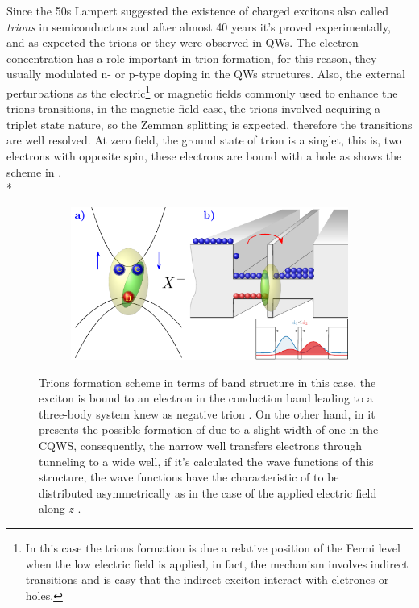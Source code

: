 Since the 50s Lampert\cite{lampert1958mobile} suggested the existence of charged excitons also called \emph{trions} in semiconductors and after almost 40 years it's proved experimentally\cite{kheng1993observation,stebe1989ground}, and as expected the trions \xp or \xm they were observed in QWs. The electron concentration has a role important in trion formation, for this reason, they usually modulated n- or p-type doping in the QWs structures.  
Also, the external perturbations as the electric\footnote{In this case the trions formation is due a relative position of the Fermi level when the low electric field is applied, in fact, the mechanism involves indirect transitions and is easy that the indirect exciton interact with elctrones or holes\cite{yuan2018tunneling}.} or magnetic fields commonly used to enhance the trions transitions, in the magnetic field case, the trions involved acquiring a triplet state nature, so the Zemman splitting is expected, therefore the transitions are well resolved. At zero field, the ground state of trion is a singlet\cite{aceituno2011therole}, this is, two electrons with opposite spin, these electrons are bound with a hole as shows the scheme in . \\*
\begin{figure}[ht!]
	\centering
	\begin{subfigure}{\textwidth}
		\includegraphics[width=\textwidth]{../figures/chapter-3/trions-scheme/build/trions-sheme}
		\label{subfig:chapter-4-trions-scheme-a)}
		\label{subfig:chapter-4-trions-scheme-b)}
	\end{subfigure}
	\caption{Trions formation scheme in terms of band structure  in this case, the exciton is bound to an electron in the conduction band leading to a three-body system knew as negative trion \xm.  On the other hand, in  it presents the possible formation of \xm due to a slight width of one in the CQWS, consequently, the narrow well transfers electrons through tunneling to a wide well, if it's calculated the wave functions of this structure, the wave functions have the characteristic of to be distributed asymmetrically as in the case of the applied electric field along $z$ \cite{sivalertporn2016effectofbarrier,debbar1989coupled}.  }
	\label{fig:chapter-4-trions-scheme}
\end{figure}

